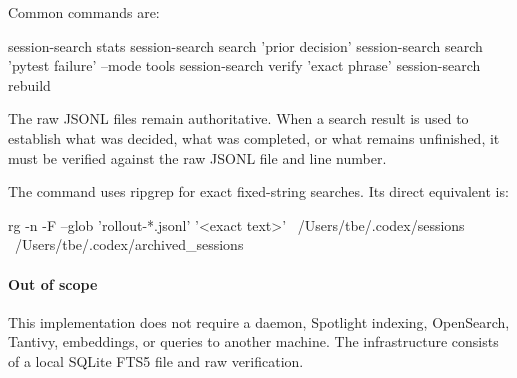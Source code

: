 Common commands are:
\begin{DocCode}
session-search stats
session-search search 'prior decision'
session-search search 'pytest failure' --mode tools
session-search verify 'exact phrase'
session-search rebuild
\end{DocCode}

The raw JSONL files remain authoritative.
When a search result is used to establish what was decided, what was completed, or what remains unfinished, it must be verified against the raw JSONL file and line number.

The  command uses ripgrep for exact fixed-string searches.
Its direct equivalent is:
\begin{DocCode}
rg -n -F --glob 'rollout-*.jsonl' '<exact text>' \
  /Users/tbe/.codex/sessions \
  /Users/tbe/.codex/archived_sessions
\end{DocCode}

\paragraph{Out of scope}
This implementation does not require a daemon, Spotlight indexing, OpenSearch, Tantivy, embeddings, or queries to another machine.
The infrastructure consists of a local SQLite FTS5 file and raw  verification.


